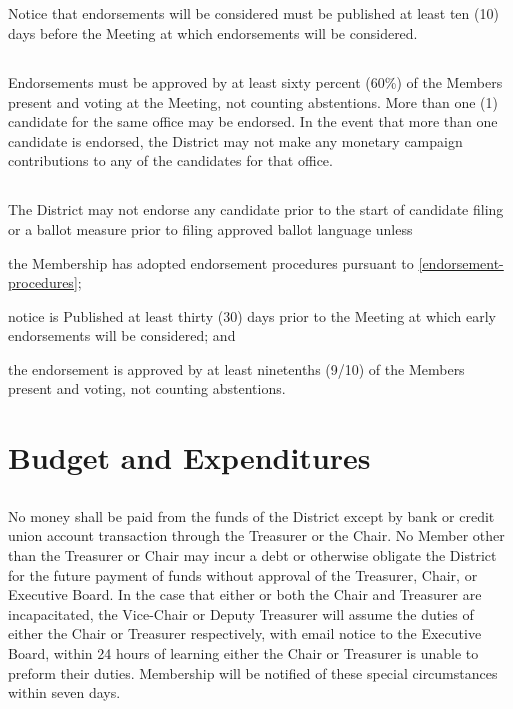 \subsection{}
Notice that endorsements will be considered must be published at least ten (10) days before the Meeting at which endorsements will be considered.

\subsection{}
Endorsements must be approved by at least sixty percent (60\%) of the Members present and voting at the Meeting, not counting abstentions. More than one (1) candidate for the same office may be endorsed. In the event that more than one candidate is endorsed, the \fortythird{} District  may not make any monetary campaign contributions to any of the candidates for that office.

\subsection{}
The \fortythird{} District  may not endorse any candidate prior to the start of candidate filing or a ballot measure prior to filing approved ballot language unless
\begin{inlinealphalist}
    \item the Membership has adopted endorsement procedures pursuant to \autoref{endorsement-procedures};
    \item notice is Published at least thirty (30) days prior to the Meeting at which early endorsements will be considered; and
    \item the endorsement is approved by at least ninetenths (9/10) of the Members present and voting, not counting abstentions.
\end{inlinealphalist}

\section{Budget and Expenditures}
\subsection{}
No money shall be paid from the funds of the \fortythird{} District  except by bank or credit union account transaction through the Treasurer or the Chair. No Member other than the Treasurer or Chair may incur a debt or otherwise obligate the \fortythird{} District  for the future payment of funds without approval of the Treasurer, Chair, or Executive Board. In the case that either or both the Chair and Treasurer are incapacitated, the Vice-Chair or Deputy Treasurer will assume the duties of either the Chair or Treasurer respectively, with email notice to the Executive Board, within 24 hours of learning either the Chair or Treasurer is unable to preform their duties. Membership will be notified of these special circumstances within seven days.

